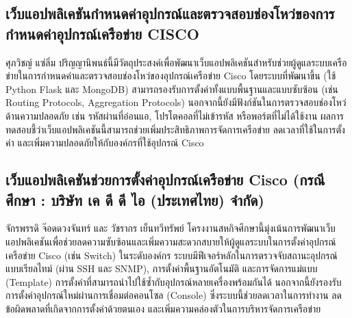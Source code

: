 \subsection{เว็บแอปพลิเคชันกำหนดค่าอุปกรณ์และตรวจสอบช่องโหว่ของการกำหนดค่าอุปกรณ์เครือข่าย CISCO}
\hspace*{1.3em} %
ศุภวิชญ์ แซ่ลิ่ม ปริญญานิพนธ์นี้มีวัตถุประสงค์เพื่อพัฒนาเว็บแอปพลิเคชันสำหรับช่วยผู้ดูแลระบบเครือข่ายในการกำหนดค่าและตรวจสอบช่องโหว่ของอุปกรณ์เครือข่าย Cisco โดยระบบที่พัฒนาขึ้น (ใช้ Python Flask และ MongoDB) สามารถรองรับการตั้งค่าทั้งแบบพื้นฐานและแบบซับซ้อน (เช่น Routing Protocols, Aggregation Protocols) นอกจากนี้ยังมีฟังก์ชันในการตรวจสอบช่องโหว่ด้านความปลอดภัย เช่น รหัสผ่านที่อ่อนแอ, โปรโตคอลที่ไม่เข้ารหัส หรือพอร์ตที่ไม่ได้ใช้งาน ผลการทดสอบชี้ว่าเว็บแอปพลิเคชันนี้สามารถช่วยเพิ่มประสิทธิภาพการจัดการเครือข่าย ลดเวลาที่ใช้ในการตั้งค่า และเพิ่มความปลอดภัยให้กับองค์กรที่ใช้อุปกรณ์ Cisco \parencite{book1}

\subsection{เว็บแอปพลิเคชันช่วยการตั้งค่าอุปกรณ์เครือข่าย Cisco (กรณีศึกษา : บริษัท เค ดี ดี ไอ (ประเทศไทย) จำกัด)}
\hspace*{1.3em} %
จักรพรรดิ จ๊อดดวงจันทร์ และ วัชรากร เย็นทวีทรัพย์ โครงงานสหกิจศึกษานี้มุ่งเน้นการพัฒนาเว็บแอปพลิเคชันเพื่อช่วยลดความซับซ้อนและเพิ่มความสะดวกสบายให้ผู้ดูแลระบบในการตั้งค่าอุปกรณ์เครือข่าย Cisco (เช่น Switch) ในระดับองค์กร ระบบมีฟีเจอร์หลักในการตรวจจับสถานะอุปกรณ์แบบเรียลไทม์ (ผ่าน SSH และ SNMP), การตั้งค่าพื้นฐานอัตโนมัติ และการจัดการแม่แบบ (Template) การตั้งค่าที่สามารถนำไปใช้ซ้ำกับอุปกรณ์หลายเครื่องพร้อมกันได้ นอกจากนี้ยังรองรับการตั้งค่าอุปกรณ์ใหม่ผ่านการเชื่อมต่อคอนโซล (Console) ซึ่งระบบนี้ช่วยลดเวลาในการทำงาน ลดข้อผิดพลาดที่เกิดจากการตั้งค่าด้วยตนเอง และเพิ่มความคล่องตัวในการบริหารจัดการเครือข่าย \parencite{book2}